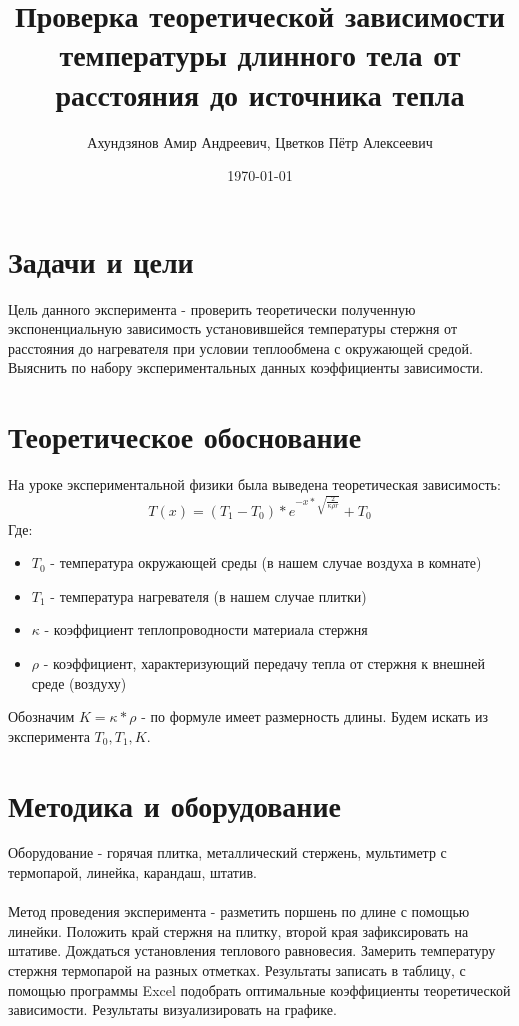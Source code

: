 \documentclass[a4paper,12pt]{article}
\begin{document}
\title{Проверка теоретической зависимости температуры длинного тела от расстояния до источника тепла}
\author{Ахундзянов Амир Андреевич, Цветков Пётр Алексеевич}
\date{\today}
\maketitle

\section{Задачи и цели}

Цель данного эксперимента - проверить теоретически полученную экспоненциальную зависимость установившейся температуры стержня от расстояния до нагревателя при условии теплообмена с окружающей средой. Выяснить по набору экспериментальных данных коэффициенты зависимости.


\section{Теоретическое обоснование}

На уроке экспериментальной физики была выведена теоретическая зависимость: 
{\Large $$T(x) = (T_1 - T_0) * e ^ {- x * \sqrt{\frac{2}{\kappa \rho r}}} + T_0$$}
Где: 
\begin{itemize}
\item $T_0$ - температура окружающей среды (в нашем случае воздуха в комнате)
\item $T_1$ - температура нагревателя (в нашем случае плитки)
\item $\kappa$ - коэффициент теплопроводности материала стержня
\item $\rho$ - коэффициент, характеризующий передачу тепла от стержня к внешней среде (воздуху)
\end{itemize}
Обозначим $K = \kappa * \rho$ - по формуле имеет размерность длины. Будем искать из эксперимента $T_0, T_1, K$.

\section{Методика и оборудование}
Оборудование - горячая плитка, металлический стержень, мультиметр с термопарой, линейка, карандаш, штатив. \\\\

Метод проведения эксперимента - разметить поршень по длине с помощью линейки. Положить край стержня на плитку, второй края зафиксировать на штативе. Дождаться установления теплового равновесия. Замерить температуру стержня термопарой на разных отметках. Результаты записать в таблицу, с помощью программы Excel подобрать оптимальные коэффициенты теоретической зависимости. Результаты визуализировать на графике.
\end{document}
